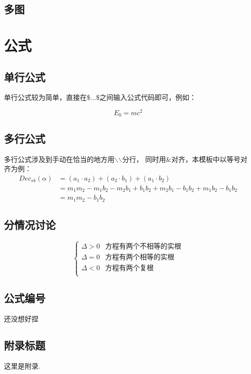 \documentclass[12pt, a4paper, oneside]{ctexart}
\begin{document}
\subsection{多图}
\newpage

\section{公式}
\subsection{单行公式}
单行公式较为简单，直接在\$...\$之间输入公式代码即可，例如：\par
\begin{equation}
    E_0=mc^2
\end{equation}

\subsection{多行公式}
多行公式涉及到手动在恰当的地方用$\backslash$$\backslash$分行，
同时用\&对齐，本模板中以等号对齐为例：\\
\begin{equation}
    \begin{split}
        Dec_{sk}(\alpha)&=(a_1\cdot a_2)+(a_2\cdot b_1)+(a_1\cdot b_2)\\
        &= m_1m_2-m_1b_2-m_2b_1+b_1b_2+m_2b_1-b_1b_2+m_1b_2-b_1b_2\\
        &= m_1m_2-b_1b_2
    \end{split}
\end{equation}
\subsection{分情况讨论}

$$
    \begin{cases}
        \Delta >0 & \text{方程有两个不相等的实根} \\
        \Delta =0 & \text{方程有两个相等的实根}  \\
        \Delta <0 & \text{方程有两个复根}     \\
    \end{cases}
$$
\subsection{公式编号}
还没想好捏


\newpage

\printbibliography[title=参考文献]

\begin{appendices}
    \renewcommand{\thesection}{\Alph{section}}
    \section{附录标题}
    这里是附录.
\end{appendices}
\end{document}
